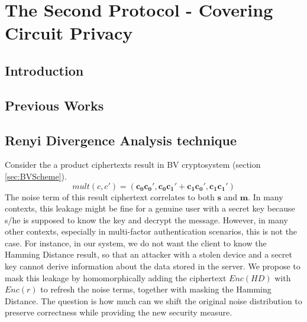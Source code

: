 \chapter{The Second Protocol - Covering Circuit Privacy}
\label{chap:renyiDivergence}

\ifpdf
    \graphicspath{{Chapter4/Figs/Raster/}{Chapter4/Figs/PDF/}{Chapter4/Figs/}}
\else
    \graphicspath{{Chapter4/Figs/Vector/}{Chapter4/Figs/}}
\fi

\section{Introduction}
\label{sec:secProcIntro}

\section{Previous Works}
\label{sec:secProcPrevious}

\section{Renyi Divergence Analysis technique}
\label{sec:secProcRenyi}
Consider the a product ciphertexts result in BV cryptosystem (section \ref{sec:BVScheme}).
\[
mult(c,c') = (\mathbf{c_0}\mathbf{c_0'}, \mathbf{c_0}\mathbf{c_1'} + \mathbf{c_1}\mathbf{c_0'}, \mathbf{c_1}\mathbf{c_1'})
\]
The noise term of this result ciphertext correlates to both $\mathbf{s}$ and $\mathbf{m}$.
In many contexts, this leakage might be fine for a genuine user with a secret key because s/he is supposed to know the key and decrypt the message.
However, in many other contexts, especially in multi-factor authentication
scenarios, this is not the case. For instance, in our system, we do not want the
client to know the Hamming Distance result, so that an attacker with a stolen
device and a secret key cannot derive information about the data stored in the
server. We propose to mask this leakage by homomorphically adding the ciphertext
$Enc(HD)$ with $Enc(r)$ to refresh the noise terms, together with masking the Hamming Distance. The question is how much can
we shift the original noise distribution to preserve correctness while providing
the new security measure.

